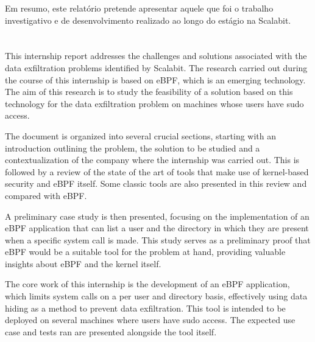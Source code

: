 \documentclass[11pt,twoside]{estiloUBI}
\begin{document}
Em resumo, este relatório pretende apresentar aquele que foi o trabalho investigativo e de desenvolvimento realizado ao longo do estágio na Scalabit.

%




\newpage
\section*{}
\vspace{0.5cm}
This internship report addresses the challenges and solutions associated with the data exfiltration problems identified by Scalabit.
The research carried out during the course of this internship is based on eBPF, which is an emerging technology. The aim of this research is to study the feasibility of a solution based on this technology for the data exfiltration problem on machines whose users have sudo access.

The document is organized into several crucial sections, starting with an introduction outlining the problem, the solution to be studied and a contextualization of the company where the internship was carried out. This is followed by a review of the state of the art of tools that make use of kernel-based security and eBPF itself. Some classic tools are also presented in this review and compared with eBPF.

A preliminary case study is then presented, focusing on the implementation of an eBPF application that can list a user and the directory in which they are present when a specific system call is made. This study serves as a preliminary proof that eBPF would be a suitable tool for the problem at hand, providing valuable insights about eBPF and the kernel itself.

The core work of this internship is the development of an eBPF application, which limits system calls on a per user and directory basis, effectively using data hiding as a method to prevent data exfiltration. This tool is intended to be deployed on several machines where users have sudo access. The expected use case and tests ran are presented alongside the tool itself.
\end{document}
